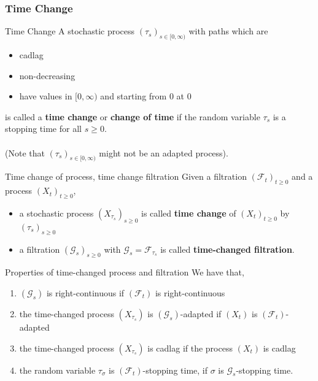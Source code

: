 \documentclass[12pt,a4paper]{article}
\begin{document}
    \subsubsection{Time Change}
    \begin{definition}{Time Change}{}
        A stochastic process $(\tau_s)_{s\in[0,\infty)}$ with paths which are
        \begin{itemize}
            \item cadlag
            \item non-decreasing
            \item have values in $[0,\infty)$ and starting from $0$ at $0$
        \end{itemize}
        is called a \textbf{time change} or \textbf{change of time} if the random variable $\tau_s$ is a stopping time for all $s\ge 0$.\\
        \\
        (Note that $(\tau_s)_{s\in[0,\infty)}$ might not be an adapted process).
    \end{definition}
    \begin{definition}{Time change of process, time change filtration}{}
        Given a filtration $(\mathscr{F}_t)_{t\ge 0}$ and a process $(X_t)_{t\ge 0}$,
        \begin{itemize}
            \item a stochastic process $(X_{\tau_s})_{s\ge 0}$ is called \textbf{time change} of $(X_t)_{t\ge 0}$ by $(\tau_s)_{s\ge 0}$
            \item a filtration $(\mathscr{G}_s)_{s\ge 0}$ with $\mathscr{G}_s = \mathscr{F}_{\tau_s}$ is called \textbf{time-changed filtration}.
        \end{itemize}
    \end{definition}
    \begin{proposition}{Properties of time-changed process and filtration}{}
        We have that,
        \begin{enumerate}
            \item $(\mathscr{G}_s)$ is right-continuous if $(\mathscr{F}_t)$ is right-continuous
            \item the time-changed process $(X_{\tau_s})$ is $(\mathscr{G}_s)$-adapted if $(X_t)$ is $(\mathscr{F}_t)$-adapted
            \item the time-changed process $(X_{\tau_s})$ is cadlag if the process $(X_t)$ is cadlag
            \item the random variable $\tau_\sigma$ is $(\mathscr{F}_t)$-stopping time, if $\sigma$ is $\mathscr{G}_s$-stopping time.
        \end{enumerate}
    \end{proposition}
\end{document}
